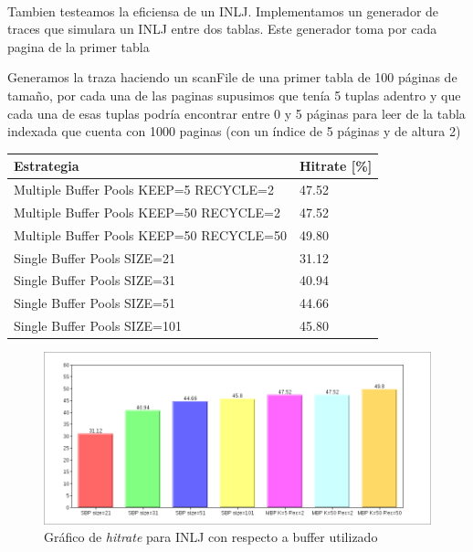 \ \\

Tambien testeamos la eficiensa de un INLJ. Implementamos un generador de traces que simulara un INLJ entre dos tablas.
Este generador toma por cada pagina de la primer tabla


Generamos la traza haciendo un scanFile de una primer tabla de 100 páginas de tama\~{n}o, por cada una de las paginas
supusimos que tenía 5 tuplas adentro y que cada una de esas tuplas podría encontrar entre 0 y 5 páginas
para leer de la tabla indexada que cuenta con 1000 paginas (con un índice de 5 páginas y de altura 2)

\begin{table}[H]
        \begin{tabular}{l||l}
    \large{\textbf{Estrategia}}                             & \large{\textbf{Hitrate}} [\%] \\
    \hline
                Multiple Buffer Pools KEEP=5 RECYCLE=2		&	47.52	\\
                Multiple Buffer Pools KEEP=50 RECYCLE=2		&	47.52	\\
                Multiple Buffer Pools KEEP=50 RECYCLE=50 	&	49.80	\\
                Single Buffer Pools SIZE=21             	&	31.12	\\
                Single Buffer Pools SIZE=31             	&	40.94	\\
                Single Buffer Pools SIZE=51             	&	44.66	\\
                Single Buffer Pools SIZE=101            	&	45.80	\\
                \end{tabular}
            \end{table}
\begin{figure}[H]\centering
    \includegraphics[scale=0.4]{INLJ.png}
    \caption{Gráfico de \textit{hitrate} para INLJ con respecto a buffer utilizado}
    \label{grafiquito3}
\end{figure}


